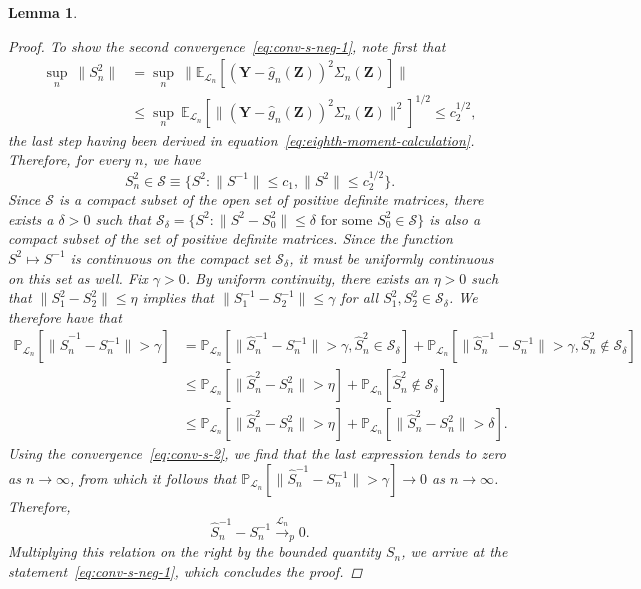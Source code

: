 \documentclass[12pt]{article}
\newtheorem{lemma}{Lemma}
\theoremstyle{definition}
\theoremstyle{remark}
\newcommand{\prz}{\bm Z}
\newcommand{\pry}{{\bm Y}}
\begin{document}
\begin{lemma}
\begin{proof}
		To show the second convergence~\eqref{eq:conv-s-neg-1}, note first that 
		\begin{equation}
			\begin{split}
				\sup_n\ \|S_n^2\| &= \sup_n\ \|\mathbb E_{\mathcal L_n}[(\pry - \widehat g_n(\prz))^2\Sigma_n(\prz)]\| \\
				&\leq  \sup_n\ \mathbb E_{\mathcal L_n}[\|(\pry - \widehat g_n(\prz))^2\Sigma_n(\prz)\|^2]^{1/2} \leq c_2^{1/2},
			\end{split}
		\end{equation}
		the last step having been derived in equation~\eqref{eq:eighth-moment-calculation}. Therefore, for every $n$, we have
		\begin{equation}
			S_n^2 \in \mathcal S \equiv \{S^2: \|S^{-1}\| \leq c_1, \|S^2\| \leq c_2^{1/2}\}.
		\end{equation}
		Since $\mathcal S$ is a compact subset of the open set of positive definite matrices, there exists a $\delta > 0$ such that
		$\mathcal S_\delta = \{S^2: \|S^2-S_0^2\| \leq \delta \text{ for some } S_0^2 \in \mathcal S\}$ is also a compact subset of the set of positive definite matrices. Since the function $S^2 \mapsto S^{-1}$ is continuous on the compact set $\mathcal S_\delta$, it must be uniformly continuous on this set as well. Fix $\gamma > 0$. By uniform continuity, there exists an $\eta > 0$ such that $\|S^2_1 - S^2_2\| \leq \eta$ implies that $\|S^{-1}_1-S^{-1}_2\| \leq \gamma$ for all $S_1^2, S_2^2 \in \mathcal S_\delta$. We therefore have that
		\begin{equation*}
			\begin{split}
				\mathbb P_{\mathcal L_n}[\|\widehat S_n^{-1} - S_n^{-1}\| > \gamma] &= \mathbb P_{\mathcal L_n}[\|\widehat S_n^{-1} - S_n^{-1}\| > \gamma, \widehat S_n^2 \in \mathcal S_\delta] +  \mathbb P_{\mathcal L_n}[\|\widehat S_n^{-1} - S_n^{-1}\| > \gamma, \widehat S_n^2 \not \in \mathcal S_\delta] \\
				&\leq \mathbb P_{\mathcal L_n}[\|\widehat S_n^{2} - S_n^{2}\| > \eta] +  \mathbb P_{\mathcal L_n}[\widehat S_n^2 \not \in \mathcal S_\delta] \\
				&\leq \mathbb P_{\mathcal L_n}[\|\widehat S_n^{2} - S_n^{2}\| > \eta] +  \mathbb P_{\mathcal L_n}[\|\widehat S_n^2-S_n^2\| > \delta].
			\end{split}
		\end{equation*}
		Using the convergence~\eqref{eq:conv-s-2}, we find that the last expression tends to zero as $n \rightarrow \infty$, from which it follows that $\mathbb P_{\mathcal L_n}[\|\widehat S_n^{-1} - S_n^{-1}\| > \gamma]  \rightarrow 0$ as $n \rightarrow \infty$. Therefore,
		\begin{equation*}
			\widehat S_n^{-1} - S_n^{-1}  \overset{\mathcal L_n}\rightarrow_p 0.
		\end{equation*}
		Multiplying this relation on the right by the bounded quantity $S_n$, we arrive at the statement~\eqref{eq:conv-s-neg-1}, which concludes the proof.
	\end{proof}
	
\end{lemma}
\end{document}
